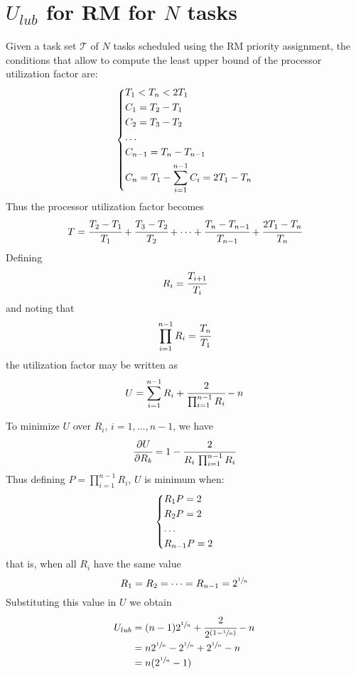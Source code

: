 \chapter{$U_{lub}$ for RM for $N$ tasks}
Given a task set $\mathcal{T}$ of $N$ tasks scheduled using the RM priority assignment, the conditions that allow to compute the least upper bound of the processor utilization factor are:
\[
\begin{dcases}
    T_1 < T_n < 2T_1\\
    C_1 = T_2 - T_1\\
    C_2 = T_3 - T_2\\
    \dots\\
    C_{n-1} = T_n - T_{n-1}\\
    C_n = T_1 - \sum_{i=1}^{n-1}C_i = 2T_1 - T_n
\end{dcases}    
\]
Thus the processor utilization factor becomes
\[T = \cfrac{T_2 - T_1}{T_1} + \cfrac{T_3- T_2}{T_2} + \dots + \cfrac{T_n- T_{n-1}}{T_{n-1}} + \cfrac{2T_1 - T_n}{T_n}\]
Defining
\[R_i = \cfrac{T_{i+1}}{T_i}\]
and noting that 
\[\prod_{i=1}^{n-1} R_i= \cfrac{T_n}{T_1}\]
the utilization factor may be written as 
\[U = \sum_{i=1}^{n-1}R_i + \cfrac{2}{\prod_{i=1}^{n-1} R_i} - n\]

To minimize $U$ over $R_i$, $i = 1,\dots, n-1$, we have
\[\cfrac{\partial U}{\partial R_k} = 1 - \cfrac{2}{R_i\,\prod_{i=1}^{n-1} R_i}\]
Thus defining $P = \prod_{i=1}^{n-1} R_i$, $U$ is minimum when:
\[
    \begin{dcases}
        R_1 P = 2\\
        R_2 P = 2\\
        \dots\\
        R_{n-1}P = 2
    \end{dcases}
\]
that is, when all $R_i$ have the same value
\[R_1 = R_2 = \dots = R_{n-1} = 2^{\sfrac{1}{n}}\]
Substituting this value in $U$ we obtain
\begin{align*}
    U_{lub} &= (n-1)2^{\sfrac{1}{n}} + \cfrac{2}{2^{(1 - \sfrac{1}{n})}} - n\\
    &= n 2^{\sfrac{1}{n}} - 2^{\sfrac{1}{n}} + 2^{\sfrac{1}{n}} -n\\
    &= n(2^{\sfrac{1}{n}} - 1)
\end{align*}